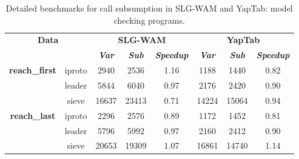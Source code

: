 \begin{table}[ht]
\centering
\footnotesize{
  \begin{tabular}{cc|ccc|ccc}
   \hline
    \hline
    \multicolumn{2}{c|}{\multirow{2}{*}{\small{\textbf{Data}}}} & \multicolumn{3}{c|}{\small{\textbf{SLG-WAM}}} & \multicolumn{3}{c}{\small{\textbf{YapTab}}} \\
     \multicolumn{2}{c|}{} & \textbf{\textit{Var}} & \textbf{\textit{Sub}} & \textbf{\textit{Speedup}} & \textbf{\textit{Var}} & \textbf{\textit{Sub}} & \textbf{\textit{Speedup}} \\
   \hline
   \hline

\multirow{3}{*}{\textbf{reach\_first}} &  \scriptsize{iproto}  &  2940 & 2536 &  1.16  & 1188 & 1440 &  0.82 \\
&  \scriptsize{leader}  &  5844 & 6040 &  0.97  & 2176 & 2420 &  0.90 \\
&  \scriptsize{sieve}  &  16637 & 23413 &  0.71  & 14224 & 15064 &  0.94 \\
\hline
\multirow{3}{*}{\textbf{reach\_last}} &  \scriptsize{iproto}  &  2296 & 2576 &  0.89  & 1172 & 1452 &  0.81 \\
&  \scriptsize{leader}  &  5796 & 5992 &  0.97  & 2160 & 2412 &  0.90 \\
&  \scriptsize{sieve}  &  20653 & 19309 &  1.07  & 16861 & 14740 &  1.14 \\
\hline
\hline
\end{tabular}
}
\caption{Detailed benchmarks for call subsumption in SLG-WAM and YapTab: model checking programs.}
\label{tbl:result_model_detail}
\end{table}